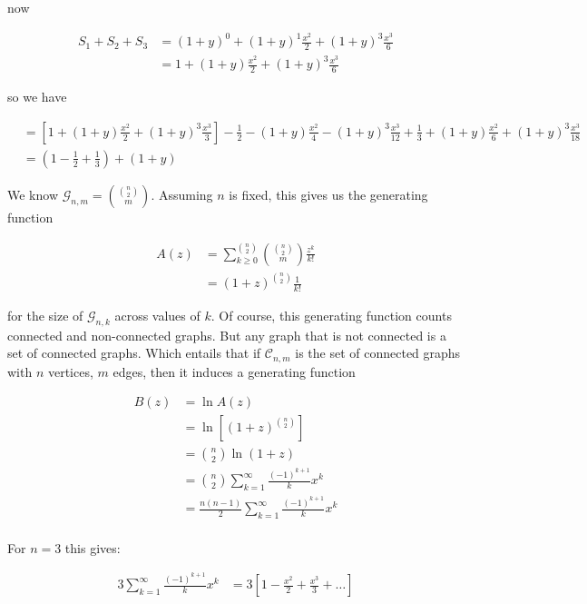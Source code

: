 \documentclass[a4paper, 12pt]{article}
\begin{document}
now 

\begin{align*}
    S_1 + S_2 + S_3 &= (1+y)^{0} + (1+y)^{1}\frac{x^2}{2} + (1+y)^{3} \frac{x^{3}}{6}\\ 
                    &=1 + (1+y)\frac{x^2}{2} + (1+y)^3 \frac{x^3}{6}
\end{align*}

so we have 

\begin{align*}
    &=\left[ 1 + (1+y) \frac{x^2}{2} + (1+y)^{3} \frac{x^3}{3} \right] - \frac{1}{2} - (1+y)\frac{ x^2 }{4} - (1+y)^3 \frac{x^3}{12} + \frac{1}{3} + (1+y)\frac{x^2}{6}+(1+y)^{3}\frac{x^3}{18} \\ 
    &= (1 - \frac{1}{2} + \frac{1}{3}) + (1+y)^{}
\end{align*}


\pagebreak 

We know $\mathcal{G}_{n, m} = \binom{\binom{n}{2}}{m}$. Assuming $n$ is fixed, this 
gives us the generating function

\begin{align*}
    A(z) &= \sum_{k\geq 0}^{\binom{n}{2}} \binom{\binom{n}{2}}{m}\frac{ z^k }{k!} \\ 
         &=\left(1+z\right)^{\binom{n}{2}}\frac{1}{k!}
\end{align*}

for the size of $\mathcal{G}_{n, k}$ across values of $k$. Of course, this generating 
function counts connected and non-connected graphs. But any graph that is 
not connected is a set of connected graphs. Which entails that if $\mathcal{C}_{n, m}$ 
is the set of connected graphs with $n$ vertices, $m$ edges, then it induces 
a generating function

\begin{align*}
    B(z) &= \ln A(z) \\ 
         &= \ln \left[ (1+z)^\binom{n}{2} \right]  \\ 
         &= \binom{n}{2} \ln(1 + z) \\ 
         &= \binom{n}{2} \sum_{k=1}^{\infty} \frac{ (-1)^{k+1} }{k}x^k \\ 
         &= \frac{n(n-1)}{2} \sum_{k=1}^{\infty} \frac{ (-1)^{k+1} }{k}x^k \\ 
\end{align*}

For $n = 3$ this gives: 

\begin{align*}
    3 \sum_{k=1}^{\infty} \frac{ (-1)^{k+1} }{k}x^k &= 3 \left[ 1 - \frac{x^2}{2} + \frac{x^3}{3} + \ldots \right] 
\end{align*}
\end{document}
